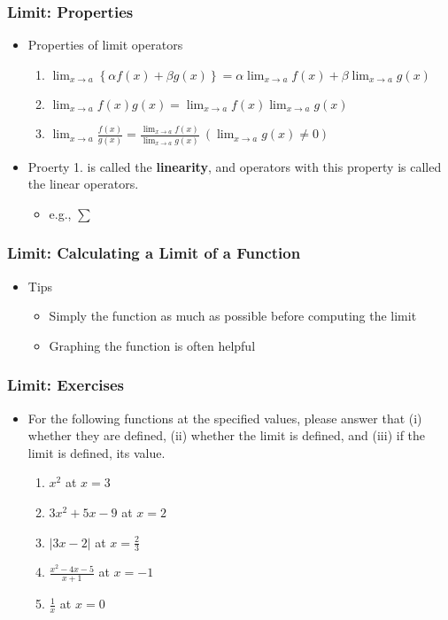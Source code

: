 \documentclass[pdflatex, 12pt]{beamer}
\begin{document}
\begin{frame}
\frametitle{Limit: Properties}
\begin{itemize}
\item Properties of limit operators
 \begin{enumerate}
 \item $\lim_{x \to a} \left\{\alpha f(x) + \beta g(x)\right\} = \alpha \lim_{x \to a} f(x) + \beta \lim_{x \to a} g(x)$
 \item $\lim_{x \to a} f(x)g(x) = \lim_{x \to a} f(x) \lim_{x \to a} g(x)$
 \item $\lim_{x \to a} \frac{f(x)}{g(x)} = \frac{\lim_{x \to a} f(x)}{\lim_{x \to a} g(x)} \ (\lim_{x \to a} g(x) \neq 0)$
 \end{enumerate}
\vspace{0.4cm}
\item Proerty 1. is called the \textbf{linearity}, and operators with this property is called the linear operators.
 \begin{itemize}
 \item e.g., $\sum$
 \end{itemize}
\end{itemize}
\end{frame}

\begin{frame}
\frametitle{Limit: Calculating a Limit of a Function}
\begin{itemize}
\item Tips
 \begin{itemize}
 \item Simply the function as much as possible before computing the limit
 \item Graphing the function is often helpful
 \end{itemize}
\end{itemize}
\end{frame}

\begin{frame}
\frametitle{Limit: Exercises}
\begin{itemize}
\item For the following functions at the specified values, please answer that (i) whether they are defined, (ii) whether the limit is defined, and (iii) if the limit is defined, its value.
 \begin{enumerate}
 \item $x^2$ at $x = 3$
 \item $3x^2 + 5x - 9$ at $x = 2$
 \item $|3x - 2|$ at $x = \frac{2}{3}$
 \vspace{0.1cm}
 \item $\frac{x^2 - 4x - 5}{x + 1}$ at $x = -1$
 \vspace{0.1cm}
 \item $\frac{1}{x}$ at $x = 0$
 \end{enumerate}
\end{itemize}
\end{frame}
\end{document}
